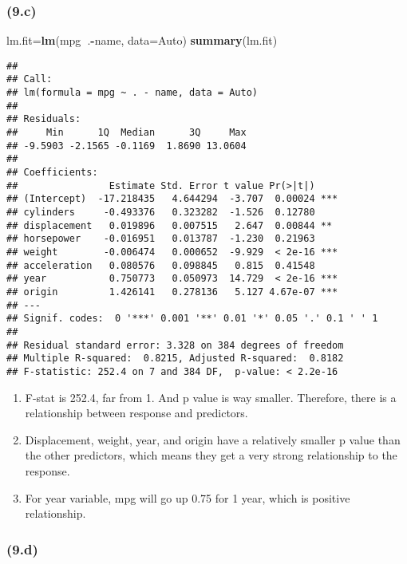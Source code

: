 \documentclass[]{article}
\newenvironment{Shaded}{\begin{snugshade}}{\end{snugshade}}
\newcommand{\DataTypeTok}[1]{\textcolor[rgb]{0.13,0.29,0.53}{#1}}
\newcommand{\KeywordTok}[1]{\textcolor[rgb]{0.13,0.29,0.53}{\textbf{#1}}}
\newcommand{\NormalTok}[1]{#1}
\newcommand{\OperatorTok}[1]{\textcolor[rgb]{0.81,0.36,0.00}{\textbf{#1}}}
\providecommand{\tightlist}{%
  \setlength{\itemsep}{0pt}\setlength{\parskip}{0pt}}
\begin{document}
\hypertarget{c-1}{%
\subsubsection{(9.c)}\label{c-1}}

\begin{Shaded}
\begin{Highlighting}[]
\NormalTok{lm.fit=}\KeywordTok{lm}\NormalTok{(mpg}\OperatorTok{~}\NormalTok{.}\OperatorTok{-}\NormalTok{name, }\DataTypeTok{data=}\NormalTok{Auto)}
\KeywordTok{summary}\NormalTok{(lm.fit)}
\end{Highlighting}
\end{Shaded}

\begin{verbatim}
## 
## Call:
## lm(formula = mpg ~ . - name, data = Auto)
## 
## Residuals:
##     Min      1Q  Median      3Q     Max 
## -9.5903 -2.1565 -0.1169  1.8690 13.0604 
## 
## Coefficients:
##                Estimate Std. Error t value Pr(>|t|)    
## (Intercept)  -17.218435   4.644294  -3.707  0.00024 ***
## cylinders     -0.493376   0.323282  -1.526  0.12780    
## displacement   0.019896   0.007515   2.647  0.00844 ** 
## horsepower    -0.016951   0.013787  -1.230  0.21963    
## weight        -0.006474   0.000652  -9.929  < 2e-16 ***
## acceleration   0.080576   0.098845   0.815  0.41548    
## year           0.750773   0.050973  14.729  < 2e-16 ***
## origin         1.426141   0.278136   5.127 4.67e-07 ***
## ---
## Signif. codes:  0 '***' 0.001 '**' 0.01 '*' 0.05 '.' 0.1 ' ' 1
## 
## Residual standard error: 3.328 on 384 degrees of freedom
## Multiple R-squared:  0.8215, Adjusted R-squared:  0.8182 
## F-statistic: 252.4 on 7 and 384 DF,  p-value: < 2.2e-16
\end{verbatim}

\begin{enumerate}
\def\labelenumi{\roman{enumi}.}
\tightlist
\item
  F-stat is 252.4, far from 1. And p value is way smaller. Therefore,
  there is a relationship between response and predictors.
\item
  Displacement, weight, year, and origin have a relatively smaller p
  value than the other predictors, which means they get a very strong
  relationship to the response.
\item
  For year variable, mpg will go up 0.75 for 1 year, which is positive
  relationship.
\end{enumerate}

\hypertarget{d-1}{%
\subsubsection{(9.d)}\label{d-1}}
\end{document}
